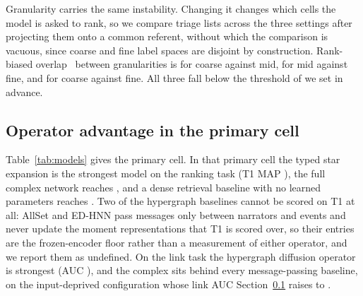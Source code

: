 \documentclass[conference]{IEEEtran}
\begin{document}
Granularity carries the same instability. Changing it changes which cells the model is asked
to rank, so we compare triage lists across the three settings after projecting them onto a
common referent, without which the comparison is vacuous, since coarse and fine
label spaces are disjoint by construction. Rank-biased overlap~\citep{webber2010rbo} between
granularities is \rboCoarseMid{} for coarse against mid, \rboMidFine{} for mid against fine,
and \rboCoarseFine{} for coarse against fine. All three fall below the threshold of
\rboThreshold{} we set in advance.

\subsection{Operator advantage in the primary cell}
\label{sec:p3}

Table~\ref{tab:models} gives the primary cell. In that primary cell the typed star
expansion is the strongest model on the ranking task (T1 MAP \MthreeTone{}), the
full complex network reaches \MfiveTone{}, and a dense retrieval baseline with no learned
parameters reaches \MoneTone{}. Two of the hypergraph baselines cannot be scored on T1 at all: AllSet and
ED-HNN pass messages only between narrators and events and never update the moment
representations that T1 is scored over, so their entries are the frozen-encoder floor rather
than a measurement of either operator, and we report them as undefined. On the link task the
hypergraph diffusion operator~\citep{wang2023edhnn} is strongest (AUC \MfourTtwo{}), and the
complex sits behind every message-passing baseline, on the input-deprived configuration whose
link AUC Section~\ref{sec:p3} raises to \facFiveEncAuc{}.
\end{document}
